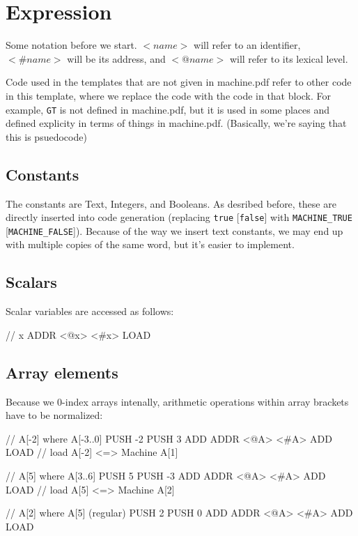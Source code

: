 \section{Expression}

Some notation before we start. $<name>$ will refer to an identifier,
$<\#name>$ will be its address, and $<@name>$ will refer to its lexical level.

Code used in the templates that are not given in machine.pdf refer to other code
in this template, where we replace the code with the code in that block. For
example, \texttt{GT} is not defined in machine.pdf, but it is used in some
places and defined explicity in terms of things in machine.pdf. (Basically,
we're saying that this is psuedocode)

\subsection{Constants}
The constants are Text, Integers, and Booleans. As desribed before, these are
directly inserted into code generation (replacing \texttt{true} [\texttt{false}]
with \texttt{MACHINE\_TRUE} [\texttt{MACHINE\_FALSE}]).
Because of the way we insert text constants, we may end up with multiple copies
of the same word, but it's easier to implement.

\subsection{Scalars}
Scalar variables are accessed as follows:

\begin{code}
// x
ADDR <@x> <#x>
LOAD
\end{code}

\subsection{Array elements}
Because we 0-index arrays intenally, arithmetic operations within array brackets
have to be normalized:

\begin{code}
// A[-2] where A[-3..0]
PUSH -2
PUSH 3
ADD
ADDR <@A> <#A>
ADD
LOAD // load A[-2] <=> Machine A[1]

// A[5] where A[3..6]
PUSH 5
PUSH -3
ADD
ADDR <@A> <#A>
ADD
LOAD // load A[5] <=> Machine A[2]

// A[2]  where A[5] (regular)
PUSH 2
PUSH 0
ADD
ADDR <@A> <#A>
ADD
LOAD
\end{code}

